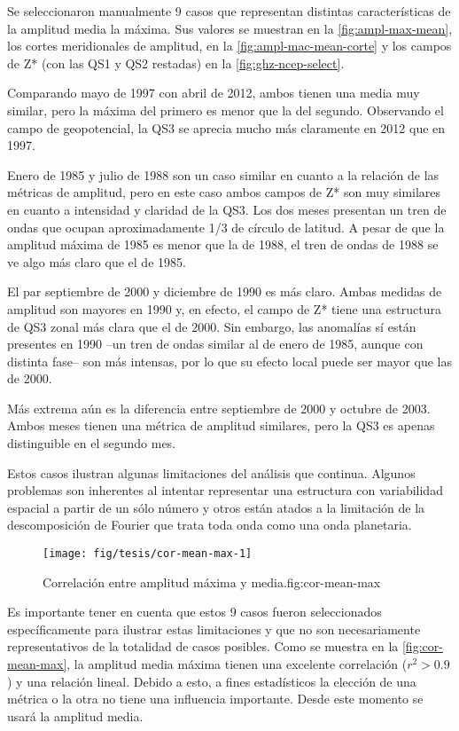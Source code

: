 \documentclass[spanish,a4paper]{book}
\begin{document}
Se seleccionaron manualmente 9 casos que representan distintas
características de la amplitud media la máxima. Sus valores se muestran
en la \autoref{fig:ampl-max-mean}, los cortes meridionales de amplitud,
en la \autoref{fig:ampl-mac-mean-corte} y los campos de Z* (con las QS1
y QS2 restadas) en la \autoref{fig:ghz-ncep-select}.

Comparando mayo de 1997 con abril de 2012, ambos tienen una media muy
similar, pero la máxima del primero es menor que la del segundo.
Observando el campo de geopotencial, la QS3 se aprecia mucho más
claramente en 2012 que en 1997.

Enero de 1985 y julio de 1988 son un caso similar en cuanto a la
relación de las métricas de amplitud, pero en este
caso ambos campos de Z* son muy similares en cuanto
a intensidad y claridad de la QS3. Los dos meses presentan un tren de
ondas que ocupan aproximadamente 1/3 de círculo de latitud. A pesar de
que la amplitud máxima de 1985 es menor que la de 1988, el tren de ondas
de 1988 se ve algo más claro que el de 1985.

El par septiembre de 2000 y diciembre de 1990 es más claro. Ambas
medidas de amplitud son mayores en 1990 y, en efecto, el campo de Z*
tiene una estructura de QS3 zonal más clara que el de 2000. Sin embargo,
las anomalías sí están presentes en 1990 --un tren de ondas similar al
de enero de 1985, aunque con distinta fase-- son más intensas, por lo
que su efecto local puede ser mayor que las de 2000.

Más extrema aún es la diferencia entre septiembre de 2000 y octubre de
2003. Ambos meses tienen una métrica de amplitud similares, pero la QS3
es apenas distinguible en el segundo mes.

Estos casos ilustran algunas limitaciones del análisis que continua.
Algunos problemas son inherentes al intentar representar una estructura
con variabilidad espacial a partir de un sólo número y otros están
atados a la limitación de la descomposición de Fourier que trata toda
onda como una onda
planetaria.

\begin{figure}
\texttt{[image: fig/tesis/cor-mean-max-1]} \caption{Correlación entre amplitud máxima y media.{fig:cor-mean-max}}\label{fig:cor-mean-max}
\end{figure}

Es importante tener en cuenta que estos 9 casos fueron seleccionados
específicamente para ilustrar estas limitaciones y que no son
necesariamente representativos de la totalidad de casos posibles. Como
se muestra en la \autoref{fig:cor-mean-max}, la amplitud media máxima
tienen una excelente correlación (\(r^2>0.9\)) y una relación lineal.
Debido a esto, a fines estadísticos la elección de una métrica o la otra
no tiene una influencia importante. Desde este momento se usará la
amplitud media.
\end{document}
